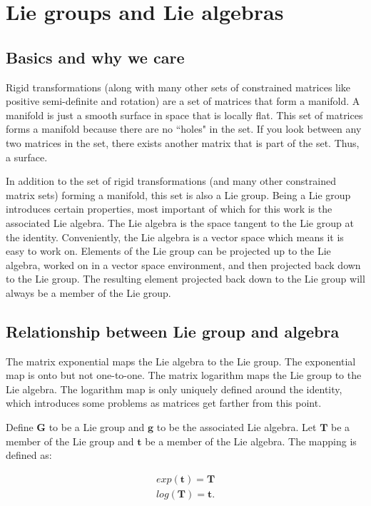 \documentclass[11pt]{article}
\theoremstyle{definition}
\begin{document}
\section{Lie groups and Lie algebras}

\subsection{Basics and why we care}

Rigid transformations (along with many other sets of constrained matrices like positive semi-definite and rotation) are a set of matrices that form a manifold. A manifold is just a smooth surface in space that is locally flat. This set of matrices forms a manifold because there are no ``holes" in the set. If you look between any two matrices in the set, there exists another matrix that is part of the set. Thus, a surface.

In addition to the set of rigid transformations (and many other constrained matrix sets) forming a manifold, this set is also a Lie group. Being a Lie group introduces certain properties, most important of which for this work is the associated Lie algebra. The Lie algebra is the space tangent to the Lie group at the identity. Conveniently, the Lie algebra is a vector space which means it is easy to work on. Elements of the Lie group can be projected up to the Lie algebra, worked on in a vector space environment, and then projected back down to the Lie group. The resulting element projected back down to the Lie group will always be a member of the Lie group.

\subsection{Relationship between Lie group and algebra}

The matrix exponential maps the Lie algebra to the Lie group. The exponential map is onto but not one-to-one. The matrix logarithm maps the Lie group to the Lie algebra. The logarithm map is only uniquely defined around the identity, which introduces some problems as matrices get farther from this point.

Define $\mathbf{G}$ to be a Lie group and $\mathbf{g}$ to be the associated Lie algebra. Let $\mathbf{T}$ be a member of the Lie group and $\mathbf{t}$ be a member of the Lie algebra. The mapping is defined as:

\begin{gather*}
    exp(\mathbf{t}) = \mathbf{T} \\
    log(\mathbf{T}) = \mathbf{t}.
\end{gather*}
\end{document}
